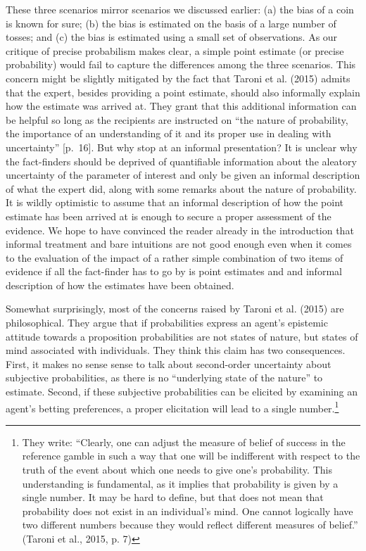 \documentclass[
  10pt,
  dvipsnames,enabledeprecatedfontcommands]{scrartcl}
\begin{document}
These three scenarios mirror scenarios we discussed earlier: (a) the
bias of a coin is known for sure; (b) the bias is estimated on the basis
of a large number of tosses; and (c) the bias is estimated using a small
set of observations. As our critique of precise probabilism makes clear,
a simple point estimate (or precise probability) would fail to capture
the differences among the three scenarios. This concern might be
slightly mitigated by the fact that Taroni et al. (2015) admits that the
expert, besides providing a point estimate, should also informally
explain how the estimate was arrived at. They grant that this additional
information can be helpful so long as the recipients are instructed on
``the nature of probability, the importance of an understanding of it
and its proper use in dealing with uncertainty'' {[}p.~16{]}. But why
stop at an informal presentation? It is unclear why the fact-finders
should be deprived of quantifiable information about the aleatory
uncertainty of the parameter of interest and only be given an informal
description of what the expert did, along with some remarks about the
nature of probability. It is wildly optimistic to assume that an
informal description of how the point estimate has been arrived at is
enough to secure a proper assessment of the evidence. We hope to have
convinced the reader already in the introduction that informal treatment
and bare intuitions are not good enough even when it comes to the
evaluation of the impact of a rather simple combination of two items of
evidence if all the fact-finder has to go by is point estimates and and
informal description of how the estimates have been obtained.

Somewhat surprisingly, most of the concerns raised by Taroni et al.
(2015) are philosophical. They argue that if probabilities express an
agent's epistemic attitude towards a proposition probabilities are not
states of nature, but states of mind associated with individuals. They
think this claim has two consequences. First, it makes no sense sense to
talk about second-order uncertainty about subjective probabilities, as
there is no ``underlying state of the nature'' to estimate. Second, if
these subjective probabilities can be elicited by examining an agent's
betting preferences, a proper elicitation will lead to a single
number.\footnote{They write: ``Clearly, one can adjust the measure of
  belief of success in the reference gamble in such a way that one will
  be indifferent with respect to the truth of the event about which one
  needs to give one's probability. This understanding is fundamental, as
  it implies that probability is given by a single number. It may be
  hard to define, but that does not mean that probability does not exist
  in an individual's mind. One cannot logically have two different
  numbers because they would reflect different measures of belief.''
  (Taroni et al., 2015, p. 7)}
\end{document}
